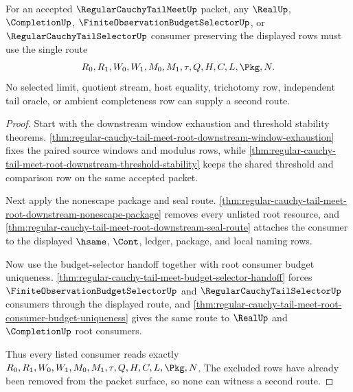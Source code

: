 \begin{theorem}
\label{thm:regular-cauchy-tail-meet-root-budget-route-lock}
For an accepted $\RegularCauchyTailMeetUp$ packet, any $\RealUp$,
$\CompletionUp$, $\FiniteObservationBudgetSelectorUp$, or
$\RegularCauchyTailSelectorUp$ consumer preserving the displayed rows must use
the single route
$$
R_0,R_1,W_0,W_1,M_0,M_1,\tau,Q,H,C,L,\Pkg,N.
$$
No selected limit, quotient stream, host equality, trichotomy row, independent
tail oracle, or ambient completeness row can supply a second route.
\end{theorem}
\begin{proof}
Start with the downstream window exhaustion and threshold stability theorems.
\autoref{thm:regular-cauchy-tail-meet-root-downstream-window-exhaustion} fixes
the paired source windows and modulus rows, while
\autoref{thm:regular-cauchy-tail-meet-root-downstream-threshold-stability}
keeps the shared threshold and comparison row on the same accepted packet.

Next apply the nonescape package and seal route.
\autoref{thm:regular-cauchy-tail-meet-root-downstream-nonescape-package}
removes every unlisted root resource, and
\autoref{thm:regular-cauchy-tail-meet-root-downstream-seal-route} attaches the
consumer to the displayed $\hsame$, $\Cont$, ledger, package, and local naming
rows.

Now use the budget-selector handoff together with root consumer budget
uniqueness.
\autoref{thm:regular-cauchy-tail-meet-budget-selector-handoff} forces
$\FiniteObservationBudgetSelectorUp$ and $\RegularCauchyTailSelectorUp$
consumers through the displayed route, and
\autoref{thm:regular-cauchy-tail-meet-root-consumer-budget-uniqueness} gives
the same route to $\RealUp$ and $\CompletionUp$ root consumers.

Thus every listed consumer reads exactly
$R_0,R_1,W_0,W_1,M_0,M_1,\tau,Q,H,C,L,\Pkg,N$. The excluded rows have already
been removed from the packet surface, so none can witness a second route.
\end{proof}

